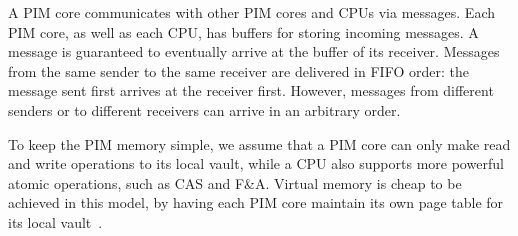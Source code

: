 A PIM core communicates with other PIM cores and CPUs via messages.
Each PIM core, as well as each CPU, has buffers for storing incoming messages.
A message is guaranteed to eventually arrive at the buffer of its receiver.
Messages from the same sender to the same receiver are delivered in FIFO order: 
the message sent first arrives at the receiver first. 
However, messages from different senders or to different receivers can arrive in an arbitrary order. 

To keep the PIM memory simple, we assume that a PIM core can only make read and write operations 
to its local vault, while a CPU also supports more powerful atomic operations, such as CAS and F\&A.
Virtual memory is cheap to be achieved in this model, 
by having each PIM core maintain its own page table for its local vault~\cite{}.